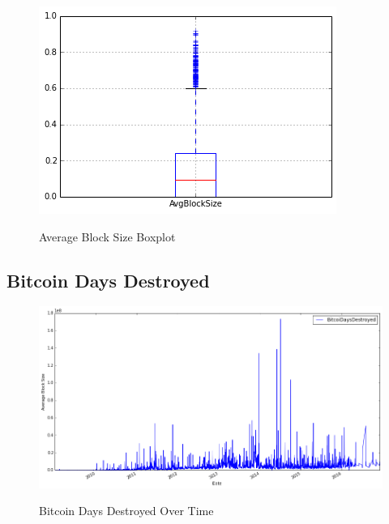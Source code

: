 \begin{figure}[bth]
  \myfloatalign
    {\includegraphics[width=1\linewidth]
      {gfx/avg-block-size-boxplot}}               
    \caption{Average Block Size Boxplot}
    \label{fig:avg-block-size-boxplot}
\end{figure}

\clearpage




\subsection{Bitcoin Days Destroyed}
\label{sec:bitcoin-days-destroyed}

\begin{figure}[bth]
  \myfloatalign
  {\includegraphics[width=1\linewidth]
    {gfx/bitcoin-days-destroyed-over-time}}
  \caption{Bitcoin Days Destroyed Over Time}
  \label{fig:bitcoin-days-destroyed-over-time}
\end{figure}

